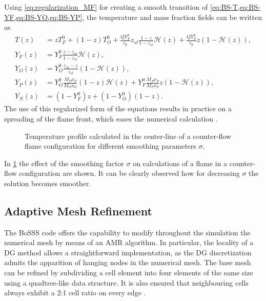 Using \cref{eq:regularization_MF} for creating a smooth transition of \cref{eq:BS-T,eq:BS-YF,eq:BS-YO,eq:BS-YP}, the temperature and mass fraction fields can be written as
\begin{subequations}
	\begin{align}
		T(z)   & = z T_F^0 + (1-z)T_O^0 + \frac{Q Y_F^0}{c_p} z_{st}\frac{1- z}{1-z_{st}}\mathcal{H}(z) +  \frac{Q Y_F^0}{c_p}z\left(1-\mathcal{H}(z)\right),  \label{eq:BS-TR} \\[1ex]
		Y_F(z) & = Y_F^0\frac{z - z_{st}}{1-z_{st}} \mathcal{H}(z), \label{eq:BS-YFR}                                                                                           \\[1ex]
		Y_O(z) & = Y_O^0 \frac{z_{st}-z}{z_{st}} (1-\mathcal{H}(z)), \label{eq:BS-YOR}                                                                                          \\[1ex]
		Y_P(z) & =  Y_O^0\frac{M_P\nu_P}{M_O\nu_O}(1-z)\mathcal{H}(z) +	Y_F^0\frac{M_P\nu_P}{M_F\nu_F}z (1-\mathcal{H}(z)), \label{eq:BS-YPR}                                   \\[1ex]
		Y_N(z) & = (1-Y_F^0)z + (1-Y_O^0)(1-z). \label{eq:BS-YNR}
	\end{align}
\end{subequations}
The use of this regularized form of the equations results in practice on a spreading of the flame front, which eases the numerical calculation \parencite{braackAdaptiveFiniteElement1997}.
\begin{figure}[h]
	\centering
	\caption{Temperature profile calculated in the center-line of a counter-flow flame configuration for different smoothing parameters $\sigma$.}
	\label{fig:smoothings}
\end{figure}
In \cref{fig:smoothings} the effect of the smoothing factor $\sigma$ on calculations of a flame in a counter-flow configuration are shown. It can be clearly observed how for decreasing $\sigma$ the solution becomes smoother.


\subsection{Adaptive Mesh Refinement}\label{ssec:MeshRefinement}
The BoSSS code offers the capability to modify throughout the simulation the numerical mesh by means of an \gls{AMR}  algorithm. In particular, the locality of a DG method allows a straightforward implementation, as the DG discretization admits the apparition of hanging nodes in the numerical mesh. The base mesh can be refined by subdividing a cell element into four elements of the same size using a quadtree-like data structure. It is also ensured that neighbouring cells always exhibit a 2:1 cell ratio on every edge \parencite{smudamartinDirectNumericalSimulation2021}. 

